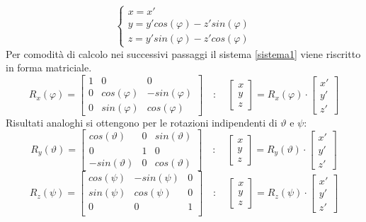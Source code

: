 \documentclass[12pt,twoside,openright]{article}
\begin{document}
\begin{equation}\label{sistema1}
\begin{cases} 
x=x' \\ 
y=y'cos(\varphi)-z'sin(\varphi) \\ 
z=y'sin(\varphi)-z'cos(\varphi)
\end{cases} 
\end{equation}
Per comodità di calcolo nei successivi passaggi il sistema \eqref{sistema1} viene riscritto in forma matriciale.
\begin{equation}\label{rx}
R_x(\varphi)=
\begin{bmatrix}
1 & 0 & 0\\
0 & cos(\varphi) & -sin(\varphi)\\
0 & sin(\varphi) & cos(\varphi)
\end{bmatrix}
\quad : \quad
\begin{bmatrix}
x \\
y \\
z 
\end{bmatrix}
=R_x(\varphi)\cdot\begin{bmatrix}
x' \\
y' \\
z' 
\end{bmatrix}
\end{equation}
Risultati analoghi si ottengono per le rotazioni indipendenti di $\vartheta$ e $\psi$:
\begin{equation}\label{ry}
R_y(\vartheta)=
\begin{bmatrix}
cos(\vartheta) & 0 & sin(\vartheta)\\
0 & 1 & 0\\
-sin(\vartheta) & 0 & cos(\vartheta)
\end{bmatrix}
\quad : \quad
\begin{bmatrix}
x \\
y \\
z 
\end{bmatrix}
=R_y(\vartheta)\cdot\begin{bmatrix}
x' \\
y' \\
z' 
\end{bmatrix}
\end{equation}
\begin{equation}\label{rz}
R_z(\psi)=
\begin{bmatrix}
cos(\psi) & -sin(\psi) & 0\\
sin(\psi) & cos(\psi) & 0\\
0 & 0 & 1\\
\end{bmatrix}
\quad : \quad
\begin{bmatrix}
x \\
y \\
z 
\end{bmatrix}
=R_z(\psi)\cdot\begin{bmatrix}
x' \\
y' \\
z' 
\end{bmatrix}
\end{equation}
\end{document}

